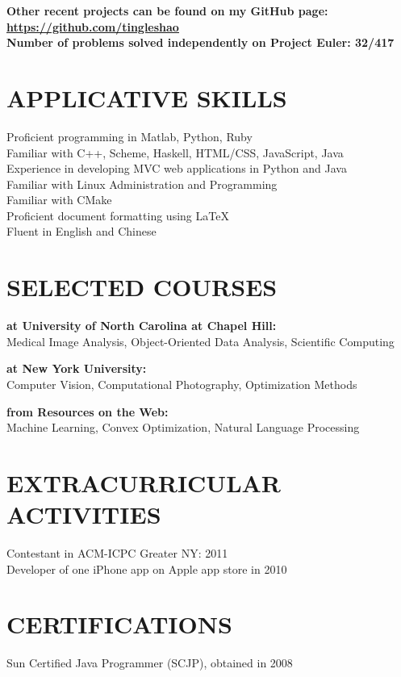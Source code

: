 \documentclass{res}
\begin{document}
\begin{resume}
\begin{tabbing}
    {\bf Other recent projects can be found on my GitHub page: \href{https://github.com/tingleshao}{\underline{https://github.com/tingleshao}}}\\[0.3cm]
    {\bf Number of problems solved independently on Project Euler: 32/417}
  \end{tabbing}

\section{APPLICATIVE SKILLS}
    \vspace{0.05in}
    Proficient programming in Matlab, Python, Ruby  \\
    Familiar with C++, Scheme, Haskell, HTML/CSS, JavaScript, Java\\
    Experience in developing MVC web applications in Python and Java\\
    Familiar with Linux Administration and Programming \\
    Familiar with CMake\\
    Proficient document formatting using \LaTeX \\
    Fluent in English and Chinese

\section{SELECTED COURSES}
     \vspace{-0.05in}	
    \begin{tabbing}
    {\bf at University of North Carolina at Chapel Hill:}\\
    Medical Image Analysis, Object-Oriented Data Analysis, Scientific Computing \\
    \end{tabbing}\vspace{-30pt}
         \begin{tabbing}
    {\bf at New York University:}\\
    Computer Vision, Computational Photography, Optimization Methods\\
        \end{tabbing}\vspace{-30pt}
         \begin{tabbing}
    {\bf from Resources on the Web:}\\
    Machine Learning, Convex Optimization, Natural Language Processing
            \end{tabbing}


\section{EXTRACURRICULAR ACTIVITIES}
    \vspace{0.05in}
    Contestant in ACM-ICPC Greater NY: 2011\\
    Developer of one iPhone app on Apple app store in 2010

 \section{CERTIFICATIONS}
  \vspace{0.05in}
    Sun Certified Java Programmer (SCJP), obtained in 2008\\

\end{resume}
\end{document}
